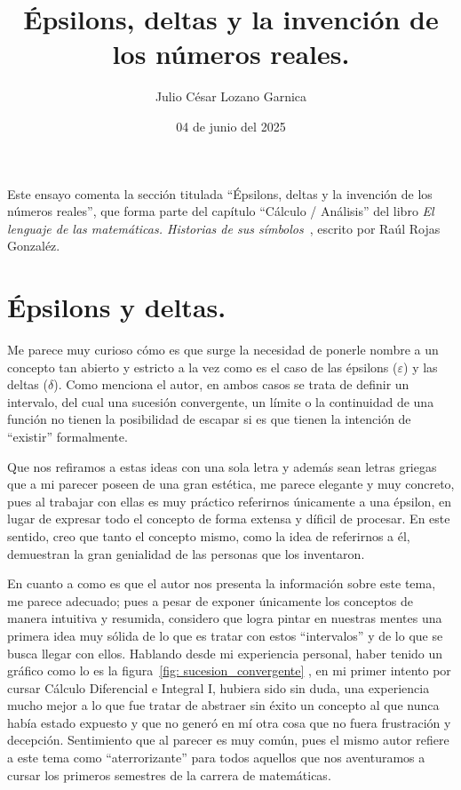 \documentclass[a4paper,10pt]{article}
\title{\huge{Épsilons, deltas y la invención de los números reales.}}
\author{Julio César Lozano Garnica}
\date{04 de junio del 2025}
\begin{document}
\maketitle

Este ensayo comenta la sección titulada \enquote{Épsilons, deltas y la invención de los números reales}, que forma parte del capítulo \enquote{Cálculo / Análisis} del libro \textit{El lenguaje de las matemáticas. Historias de sus símbolos}~\cite{rojas}, escrito por Raúl Rojas Gonzaléz. 

\section*{Épsilons y deltas.}

Me parece muy curioso cómo es que surge la necesidad de ponerle nombre a un concepto tan abierto y estricto a la vez como es el caso de las épsilons ($\varepsilon$) y las deltas ($\delta$). Como menciona el autor, en ambos casos se trata de definir un intervalo, del cual una sucesión convergente, un límite o la continuidad de una función no tienen la posibilidad de escapar si es que tienen la intención de \enquote{existir} formalmente. 

Que nos refiramos a estas ideas con una sola letra y además sean letras griegas que a mi parecer poseen de una gran estética, me parece elegante y muy concreto, pues al trabajar con ellas es muy práctico referirnos únicamente a una épsilon, en lugar de expresar todo el concepto de forma extensa y díficil de procesar. En este sentido, creo que tanto el concepto mismo, como la idea de  referirnos a él, demuestran la gran genialidad de las personas que los inventaron.

En cuanto a como es que el autor nos presenta la información sobre este tema, me parece adecuado; pues a pesar de exponer únicamente los conceptos de manera intuitiva y resumida, considero que logra pintar en nuestras mentes una primera idea muy sólida de lo que es tratar con estos \enquote{intervalos} y de lo que se busca llegar con ellos. Hablando desde mi experiencia personal, haber tenido un gráfico como lo es la figura~\ref{fig: sucesion_convergente} \cite{rojas}, en mi primer intento por cursar Cálculo Diferencial e Integral I, hubiera sido sin duda, una experiencia mucho mejor a lo que fue tratar de abstraer sin éxito un concepto al que nunca había estado expuesto y que no generó en mí otra cosa que no fuera frustración y decepción. Sentimiento que al parecer es muy común, pues el mismo autor refiere a este tema como \enquote{aterrorizante} para todos aquellos que nos aventuramos a cursar los primeros semestres de la carrera de matemáticas.
\end{document}
